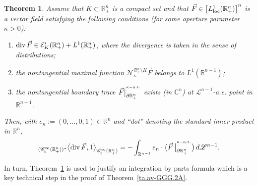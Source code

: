 \documentclass[11pt,reqno]{amsart}
\numberwithin{equation}{section}
\newtheorem{theorem}{Theorem}[section]
\theoremstyle{remark}
\begin{document}
\begin{theorem}\label{theor:div-thm}
Assume that $K\subset{\mathbb{R}}^n_{+}$ is a compact set and that
$\vec{F}\in\big[L^1_{\rm loc}({\mathbb{R}}^n_{+})\big]^n$ is a vector
field satisfying the following conditions {\rm (}for some aperture parameter $\kappa>0${\rm )}:
%
\begin{enumerate}\itemsep=0.2cm
%
\item [(a)] ${\rm div}\,\vec{F}\in\mathcal{E}'_K({\mathbb{R}}^n_{+})+L^1({\mathbb{R}}^n_{+})$,
where the divergence is taken in the sense of distributions;
%
\item[(b)] the nontangential maximal function ${\mathcal{N}}_\kappa^{\,{\mathbb{R}}^n_{+}\setminus K}\vec{F}$ 
belongs to $L^1({\mathbb{R}}^{n-1})$;
%
\item [(c)] the nontangential boundary trace 
$\vec{F}\big|_{\partial{\mathbb{R}}^n_{+}}^{{}^{\kappa-{\rm n.t.}}}$ exists 
{\rm (}in ${\mathbb{C}}^n${\rm )} at ${\mathscr{L}}^{n-1}$-a.e. point in ${\mathbb{R}}^{n-1}$.
\end{enumerate}

\noindent Then, with $e_n:=(0,\dots,0,1)\in{\mathbb{R}}^n$ and ``dot" denoting the
standard inner product in ${\mathbb{R}}^n$,
%
\begin{equation}\label{eqn:div-form}
{}_{(\mathscr{C}_b^\infty({\mathbb{R}}^n_{+}))^\ast}\big\langle{\rm div}\,\vec{F},1
\big\rangle_{\mathscr{C}_b^\infty({\mathbb{R}}^n_{+})}
=-\int_{{\mathbb{R}}^{n-1}}e_n\cdot
\big(\vec F\,\big|^{{}^{\kappa-{\rm n.t.}}}_{\partial{\mathbb{R}}^n_{+}}\bigr)\,d{\mathscr{L}}^{n-1}.
\end{equation}
\end{theorem}

In turn, Theorem~\ref{theor:div-thm} is used to justify an integration by parts formula which 
is a key technical step in the proof of Theorem~\ref{ta.av-GGG.2A}.
\end{document}
